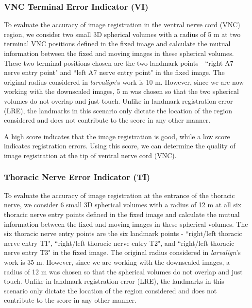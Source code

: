 \documentclass{book}
\begin{document}
	\subsubsection{VNC Terminal Error Indicator (VI)} \label{subsubsec:vi}
	To evaluate the accuracy of image registration in the ventral nerve cord (VNC) region, we consider two small 3D spherical volumes with a radius of 5 \textmu m at two terminal VNC positions defined in the fixed image and calculate the mutual information between the fixed and moving images in these spherical volumes. These two terminal positions chosen are the two landmark points - ``right A7 nerve entry point" and ``left A7 nerve entry point" in the fixed image. The original radius considered in \textit{larvalign}'s work \cite{larvalign} is 10 \textmu m. However, since we are now working with the downscaled images, 5 \textmu m was chosen so that the two spherical volumes do not overlap and just touch. Unlike in landmark registration error (LRE), the landmarks in this scenario only dictate the location of the region considered and does not contribute to the score in any other manner.
	
	A high score indicates that the image registration is good, while a low score indicates registration errors. Using this score, we can determine the quality of image registration at the tip of ventral nerve cord (VNC).
	
	\subsubsection{Thoracic Nerve Error Indicator (TI)} \label{subsubsec:ti}
	To evaluate the accuracy of image registration at the entrance of the thoracic nerve, we consider 6 small 3D spherical volumes with a radius of 12 \textmu m at all six thoracic nerve entry points defined in the fixed image and calculate the mutual information between the fixed and moving images in these spherical volumes. The six thoracic nerve entry points are the six landmark points - ``right/left thoracic nerve entry T1",  ``right/left thoracic nerve entry T2", and ``right/left thoracic nerve entry T3" in the fixed image. The original radius considered in \textit{larvalign}'s work \cite{larvalign} is 35 \textmu m. However, since we are working with the downscaled images, a radius of 12 \textmu m was chosen so that the spherical volumes do not overlap and just touch. Unlike in landmark registration error (LRE), the landmarks in this scenario only dictate the location of the region considered and does not contribute to the score in any other manner.
	
\end{document}
